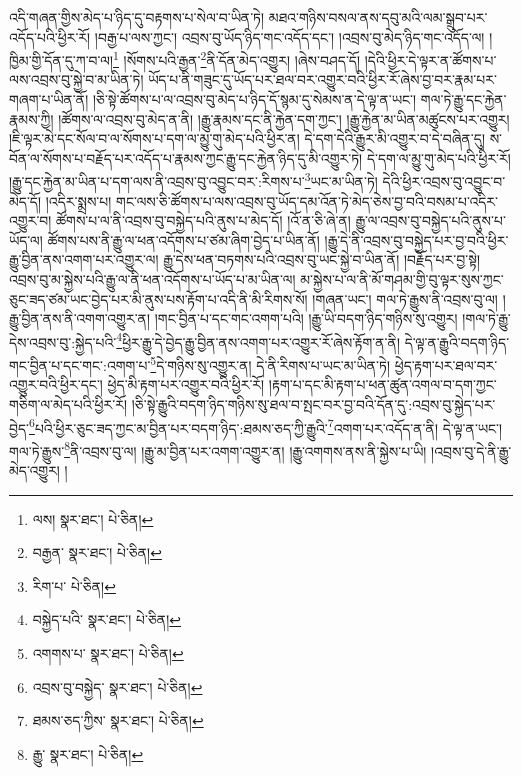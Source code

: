 འདི་གཞན་གྱིས་མེད་པ་ཉིད་དུ་བརྟགས་པ་སེལ་བ་ཡིན་ཏེ། མཐའ་གཉིས་བསལ་ནས་དབུ་མའི་ལམ་སྒྲུབ་པར་འདོད་པའི་ཕྱིར་རོ། །བརྒྱ་པ་ལས་ཀྱང་། འབྲས་བུ་ཡོད་ཉིད་གང་འདོད་དང་། །འབྲས་བུ་མེད་ཉིད་གང་འདོད་ལ། །ཁྱིམ་གྱི་དོན་དུ་ཀ་བ་ལ།\footnote{ལས།  སྣར་ཐང་།  པེ་ཅིན། } །སོགས་པའི་རྒྱན་\footnote{བརྒྱན་  སྣར་ཐང་།  པེ་ཅིན། }ནི་དོན་མེད་འགྱུར། །ཞེས་བཤད་དོ། །དེའི་ཕྱིར་དེ་ལྟར་ན་ཚོགས་པ་ལས་འབྲས་བུ་སྐྱེ་བ་མ་ཡིན་ཏེ། ཡོད་པ་ནི་གཟུང་དུ་ཡོད་པར་ཐལ་བར་འགྱུར་བའི་ཕྱིར་རོ་ཞེས་བྱ་བར་རྣམ་པར་གཞག་པ་ཡིན་ནོ། །ཅི་སྟེ་ཚོགས་པ་ལ་འབྲས་བུ་མེད་པ་ཉིད་དོ་སྙམ་དུ་སེམས་ན་དེ་ལྟ་ན་ཡང་། གལ་ཏེ་རྒྱུ་དང་རྐྱེན་རྣམས་ཀྱི། །ཚོགས་ལ་འབྲས་བུ་མེད་ན་ནི། །རྒྱུ་རྣམས་དང་ནི་རྐྱེན་དག་ཀྱང་། །རྒྱུ་རྐྱེན་མ་ཡིན་མཚུངས་པར་འགྱུར། །ཇི་ལྟར་མེ་དང་སོལ་བ་ལ་སོགས་པ་དག་ལ་མྱུ་གུ་མེད་པའི་ཕྱིར་ན། དེ་དག་དེའི་རྒྱུར་མི་འགྱུར་བ་དེ་བཞིན་དུ། ས་བོན་ལ་སོགས་པ་བརྗོད་པར་འདོད་པ་རྣམས་ཀྱང་རྒྱུ་དང་རྐྱེན་ཉིད་དུ་མི་འགྱུར་ཏེ། དེ་དག་ལ་མྱུ་གུ་མེད་པའི་ཕྱིར་རོ། །རྒྱུ་དང་རྐྱེན་མ་ཡིན་པ་དག་ལས་ནི་འབྲས་བུ་འབྱུང་བར་:རིགས་པ་\footnote{རིག་པ་  པེ་ཅིན། }ཡང་མ་ཡིན་ཏེ། དེའི་ཕྱིར་འབྲས་བུ་འབྱུང་བ་མེད་དོ། །འདིར་སྨྲས་པ། གང་ལས་ཅི་ཚོགས་པ་ལས་འབྲས་བུ་ཡོད་དམ་འོན་ཏེ་མེད་ཅེས་བྱ་བའི་བསམ་པ་འདིར་འགྱུར་བ། ཚོགས་པ་ལ་ནི་འབྲས་བུ་བསྐྱེད་པའི་ནུས་པ་མེད་དོ། །འོ་ན་ཅི་ཞེ་ན། རྒྱུ་ལ་འབྲས་བུ་བསྐྱེད་པའི་ནུས་པ་ཡོད་ལ། ཚོགས་པས་ནི་རྒྱུ་ལ་ཕན་འདོགས་པ་ཙམ་ཞིག་བྱེད་པ་ཡིན་ནོ། །རྒྱུ་དེ་ནི་འབྲས་བུ་བསྐྱེད་པར་བྱ་བའི་ཕྱིར་རྒྱུ་བྱིན་ནས་འགག་པར་འགྱུར་ལ། རྒྱུ་དེས་ཕན་བཏགས་པའི་འབྲས་བུ་ཡང་སྐྱེ་བ་ཡིན་ནོ། །བརྗོད་པར་བྱ་སྟེ། འབྲས་བུ་མ་སྐྱེས་པའི་རྒྱུ་ལ་ནི་ཕན་འདོགས་པ་ཡོད་པ་མ་ཡིན་ལ། མ་སྐྱེས་པ་ལ་ནི་མོ་གཤམ་གྱི་བུ་ལྟར་སུས་ཀྱང་ཅུང་ཟད་ཙམ་ཡང་བྱེད་པར་མི་ནུས་པས་རྟོག་པ་འདི་ནི་མི་རིགས་སོ། །གཞན་ཡང་། གལ་ཏེ་རྒྱུས་ནི་འབྲས་བུ་ལ། །རྒྱུ་བྱིན་ནས་ནི་འགག་འགྱུར་ན། །གང་བྱིན་པ་དང་གང་འགག་པའི། །རྒྱུ་ཡི་བདག་ཉིད་གཉིས་སུ་འགྱུར། །གལ་ཏེ་རྒྱུ་དེས་འབྲས་བུ་:སྐྱེད་པའི་\footnote{བསྐྱེད་པའི་  སྣར་ཐང་།  པེ་ཅིན། }ཕྱིར་རྒྱུ་དེ་བྱེད་རྒྱུ་བྱིན་ནས་འགག་པར་འགྱུར་རོ་ཞེས་རྟོག་ན་ནི། དེ་ལྟ་ན་རྒྱུའི་བདག་ཉིད་གང་བྱིན་པ་དང་གང་:འགག་པ་\footnote{འགགས་པ་  སྣར་ཐང་།  པེ་ཅིན། }དེ་གཉིས་སུ་འགྱུར་ན། དེ་ནི་རིགས་པ་ཡང་མ་ཡིན་ཏེ། ཕྱེད་རྟག་པར་ཐལ་བར་འགྱུར་བའི་ཕྱིར་དང་། ཕྱེད་མི་རྟག་པར་འགྱུར་བའི་ཕྱིར་རོ། །རྟག་པ་དང་མི་རྟག་པ་ཕན་ཚུན་འགལ་བ་དག་ཀྱང་གཅིག་ལ་མེད་པའི་ཕྱིར་རོ། །ཅི་སྟེ་རྒྱུའི་བདག་ཉིད་གཉིས་སུ་ཐལ་བ་སྤང་བར་བྱ་བའི་དོན་དུ་:འབྲས་བུ་སྐྱེད་པར་བྱེད་\footnote{འབྲས་བུ་བསྐྱེད་  སྣར་ཐང་།  པེ་ཅིན། }པའི་ཕྱིར་ཅུང་ཟད་ཀྱང་མ་བྱིན་པར་བདག་ཉིད་:ཐམས་ཅད་ཀྱི་རྒྱུའི་\footnote{ཐམས་ཅད་ཀྱིས་  སྣར་ཐང་།  པེ་ཅིན། }འགག་པར་འདོད་ན་ནི། དེ་ལྟ་ན་ཡང་། གལ་ཏེ་རྒྱུས་\footnote{རྒྱུ་  སྣར་ཐང་།  པེ་ཅིན། }ནི་འབྲས་བུ་ལ། །རྒྱུ་མ་བྱིན་པར་འགག་འགྱུར་ན། །རྒྱུ་འགགས་ནས་ནི་སྐྱེས་པ་ཡི། །འབྲས་བུ་དེ་ནི་རྒྱུ་མེད་འགྱུར། །
